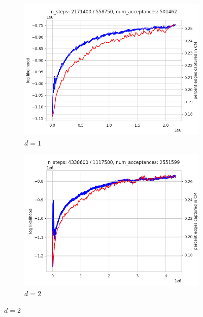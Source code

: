 \begin{figure}
    \centering

    \begin{subfigure}{0.49\textwidth}
      \centering
      \includegraphics[width=\linewidth]{figures/socfb-Amherst41-1d.png}
      \caption{$d=1$}
    \end{subfigure}
    \hfill
    \begin{subfigure}{0.49\textwidth}
      \centering
      \includegraphics[width=\linewidth]{figures/socfb-Amherst41-2d.png}
      \caption{$d=2$}
    \end{subfigure}
  
    \vspace{1em}
  

\end{figure}
